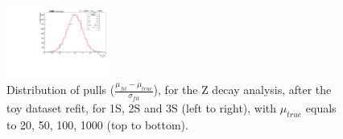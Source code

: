 \begin{figure}[!htbp]
\begin{center}
\includegraphics[width=0.3\textwidth]{figures_and_tables/modeling_xchecks/plots/ZToUpsilon3SPhoton_Cat0_signalStrenght_1000/pulls}
\end{center}
\caption{Distribution of pulls ($\frac{\mu_{fit} - \mu_{true}}{\sigma_{fit}}$), for the Z decay analysis, after the toy dataset refit, for 1S, 2S and 3S (left to right), with $\mu_{true}$ equals to 20, 50, 100, 1000 (top to bottom).}
\label{fig:modeling_xchecks_Z}
\end{figure}




